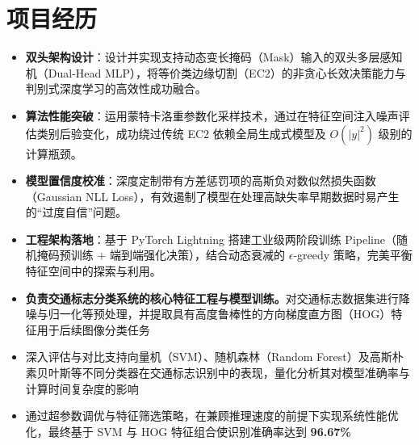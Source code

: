 \documentclass{resume}
\begin{document}
\section{项目经历}
\begin{itemize}
  \item \textbf{双头架构设计}：设计并实现支持动态变长掩码（Mask）输入的双头多层感知机（Dual-Head MLP），将等价类边缘切割（EC2）的非贪心长效决策能力与判别式深度学习的高效性成功融合。
  \item \textbf{算法性能突破}：运用蒙特卡洛重参数化采样技术，通过在特征空间注入噪声评估类别后验变化，成功绕过传统 EC2 依赖全局生成式模型及 $O(|y|^2)$ 级别的计算瓶颈。
  \item \textbf{模型置信度校准}：深度定制带有方差惩罚项的高斯负对数似然损失函数（Gaussian NLL Loss），有效遏制了模型在处理高缺失率早期数据时易产生的“过度自信”问题。
  \item \textbf{工程架构落地}：基于 PyTorch Lightning 搭建工业级两阶段训练 Pipeline（随机掩码预训练 + 端到端强化决策），结合动态衰减的 $\epsilon$-greedy 策略，完美平衡特征空间中的探索与利用。
\end{itemize}


\begin{itemize}
  \item \textbf{负责交通标志分类系统的核心特征工程与模型训练。}对交通标志数据集进行降噪与归一化等预处理，并提取具有高度鲁棒性的方向梯度直方图（HOG）特征用于后续图像分类任务
  \item 深入评估与对比支持向量机（SVM）、随机森林（Random Forest）及高斯朴素贝叶斯等不同分类器在交通标志识别中的表现，量化分析其对模型准确率与计算时间复杂度的影响
  \item 通过超参数调优与特征筛选策略，在兼顾推理速度的前提下实现系统性能优化，最终基于 SVM 与 HOG 特征组合使识别准确率达到 \textbf{96.67\%}
\end{itemize}
\end{document}

